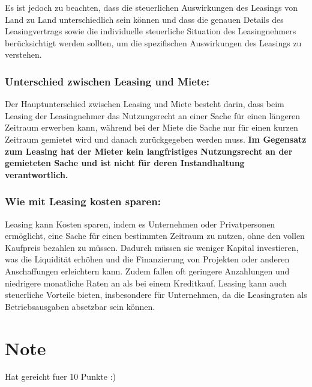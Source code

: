\documentclass{article}
\begin{document}
Es ist jedoch zu beachten, dass die steuerlichen Auswirkungen des Leasings von
Land zu Land unterschiedlich sein können und dass die genauen Details des
Leasingvertrags sowie die individuelle steuerliche Situation des Leasingnehmers
berücksichtigt werden sollten, um die spezifischen Auswirkungen des Leasings zu
verstehen.

\subsubsection*{Unterschied zwischen Leasing und Miete:}
Der Hauptunterschied zwischen Leasing und Miete besteht darin, dass beim
Leasing der Leasingnehmer das Nutzungsrecht an einer Sache für einen längeren
Zeitraum erwerben kann, während bei der Miete die Sache nur für einen kurzen
Zeitraum gemietet wird und danach zurückgegeben werden muss. \textbf{Im Gegensatz zum
Leasing hat der Mieter kein langfristiges Nutzungsrecht an der gemieteten Sache
und ist nicht für deren Instandhaltung verantwortlich.}

\subsubsection*{Wie mit Leasing kosten sparen:}
Leasing kann Kosten sparen, indem es Unternehmen oder Privatpersonen
ermöglicht, eine Sache für einen bestimmten Zeitraum zu nutzen, ohne den vollen
Kaufpreis bezahlen zu müssen. Dadurch müssen sie weniger Kapital investieren,
was die Liquidität erhöhen und die Finanzierung von Projekten oder anderen
Anschaffungen erleichtern kann. Zudem fallen oft geringere Anzahlungen und
niedrigere monatliche Raten an als bei einem Kreditkauf. Leasing kann auch
steuerliche Vorteile bieten, insbesondere für Unternehmen, da die Leasingraten
als Betriebsausgaben absetzbar sein können.


\section{Note}
Hat gereicht fuer 10 Punkte :)
\end{document}
